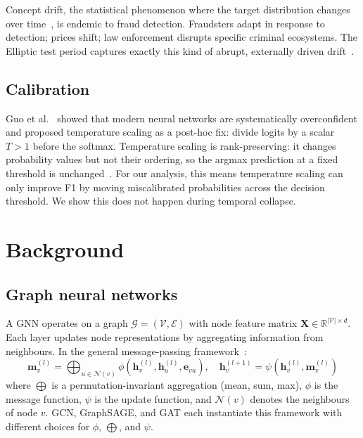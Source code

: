 Concept drift, the statistical phenomenon where the target distribution
changes over time~\citep{gama2014survey,lu2018drift}, is endemic to
fraud detection.  Fraudsters adapt in response to detection; prices
shift; law enforcement disrupts specific criminal ecosystems.  The
Elliptic test period captures exactly this kind of abrupt, externally
driven drift~\citep{quinonero2009shift}.

\subsection{Calibration}

Guo et al.~\citep{guo2017calibration} showed that modern neural
networks are systematically overconfident and proposed temperature
scaling as a post-hoc fix: divide logits by a scalar $T > 1$ before
the softmax.  Temperature scaling is rank-preserving: it changes
probability values but not their ordering, so the argmax prediction at
a fixed threshold is unchanged~\citep{platt1999calibration,zadrozny2001calibration}.
For our analysis, this means temperature scaling can only improve F1
by moving miscalibrated probabilities across the decision threshold.
We show this does not happen during temporal collapse.


\section{Background}
\label{sec:background}

\subsection{Graph neural networks}

A GNN operates on a graph $\mathcal{G} = (\mathcal{V}, \mathcal{E})$
with node feature matrix $\mathbf{X} \in \mathbb{R}^{|\mathcal{V}|
\times d}$.  Each layer updates node representations by aggregating
information from neighbours.  In the general message-passing
framework~\citep{gilmer2017mpnn}:
\begin{equation}
\mathbf{m}_v^{(l)} = \bigoplus_{u \in \mathcal{N}(v)}
  \phi\!\left(\mathbf{h}_v^{(l)}, \mathbf{h}_u^{(l)}, \mathbf{e}_{vu}\right),
\quad
\mathbf{h}_v^{(l+1)} = \psi\!\left(\mathbf{h}_v^{(l)}, \mathbf{m}_v^{(l)}\right)
\label{eq:mpnn}
\end{equation}
where $\bigoplus$ is a permutation-invariant aggregation (mean, sum,
max), $\phi$ is the message function, $\psi$ is the update function,
and $\mathcal{N}(v)$ denotes the neighbours of node $v$.  GCN, GraphSAGE,
and GAT each instantiate this framework with different choices for
$\phi$, $\bigoplus$, and $\psi$.

